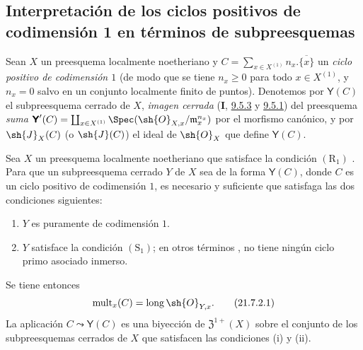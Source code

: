 \subsection{Interpretación de los ciclos positivos de codimensión 1 en términos de subpreesquemas}
\label{subsection:IV.21.7}
\label{IV.21.7}

\begin{env}[21.7.1]
\label{IV.21.7.1}
Sean $X$ un preesquema localmente noetheriano y $C=\sum_{x\in X^{(1)}}n_x.\overline{\{x\}}$ un \emph{ciclo positivo de codimensión $1$} (de modo que se tiene $n_x\geq0$ para todo $x\in X^{(1)}$, y $n_x=0$ salvo en un conjunto localmente finito de puntos).
Denotemos por $\boldsymbol{\mathsf{Y}}(C)$ el subpreesquema cerrado de $X$, \emph{imagen cerrada} (\textbf{I}, \hyperref[I.9.5.3]{9.5.3} y \hyperref[IV.9.5.1]{9.5.1}) del preesquema \emph{suma} $\boldsymbol{\mathsf{Y}}'(C)=\coprod_{x\in X^{(1)}}\Spec(\sh{O}_{X,x}/\mathfrak{m}_x^{n_x})$ por el morfismo canónico, y por $\sh{J}_X(C)$ (o $\sh{J}(C)$) el ideal de $\sh{O}_X$ que define $\boldsymbol{\mathsf{Y}}(C)$.
\end{env}

\begin{proposition}[21.7.2]
\label{IV.21.7.2}
Sea $X$ un preesquema localmente noetheriano que satisface la condición $(\mathrm{R}_1)$ .
Para que un subpreesquema cerrado $Y$ de $X$ sea de la forma $\boldsymbol{\mathsf{Y}}(C)$, donde $C$ es un ciclo positivo de codimensión $1$, es necesario y suficiente que satisfaga las dos condiciones siguientes:
\begin{enumerate}[label=\textup{(\roman*)}]
  \item $Y$ es puramente de codimensión $1$.
  \item $Y$ satisface la condición $(\mathrm{S}_1)$; en otros términos , no tiene ningún ciclo primo asociado inmerso.
\end{enumerate}
Se tiene entonces
\[
\label{IV.21.7.2.1}
  \operatorname{mult}_x(C)=\operatorname{long}\sh{O}_{Y,x}.
  \tag{21.7.2.1}
\]
La aplicación $C\leadsto\boldsymbol{\mathsf{Y}}(C)$ es una biyección de $\mathfrak{Z}^{1+}(X)$ sobre el conjunto de los subpreesquemas cerrados de $X$ que satisfacen las condiciones \textup{(i)} y \textup{(ii)}.
\end{proposition}

